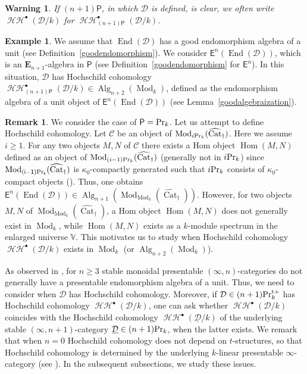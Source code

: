 \documentclass[leqno,12pt]{amsart}
\theoremstyle{plain}
\newtheorem{Warning}{Warning}[Theorem]
\theoremstyle{definition}
\newtheorem{Remark}[Theorem]{Remark}
\newtheorem{Example}[Theorem]{Example}
\newcommand{\HH}{\operatorname{\mathcal{HH}}}
\newcommand{\DDD}{\mathcal{D}}
\newcommand{\CCC}{\mathcal{C}}
\newcommand{\PR}{\textup{Pr}}
\newcommand{\PRTT}{\textup{Pr}^{\textup{t}+}}
\newcommand{\Hom}{\operatorname{Hom}}
\newcommand{\Mod}{\operatorname{Mod}}
\newcommand{\Alg}{\operatorname{Alg}}
\newcommand{\End}{\operatorname{End}}
\newcommand{\vCat}{\widehat{\operatorname{Cat}}_\dagger}
\begin{document}
\begin{Warning}
If $(n+1)\mathsf{P}$, in which $\DDD$ is defined, is clear, we often write $\HH^\bullet(\DDD/k)$ for $\HH^\bullet_{(n+1)\mathsf{P}}(\DDD/k)$.
\end{Warning}


\begin{Example}
We assume that $\End(\DDD)$ has a good endomorphism algebra of a unit (see Definition~\ref{goodendomorphism}).
We consider $\mathsf{E}^n(\End(\DDD))$, which is an $\mathbf{E}_{n+1}$-algebra in $\mathsf{P}$ (see Definition~\ref{goodendomorphism} for $\mathsf{E}^n$).
In this situation, $\DDD$ has
Hochschild cohomology $\HH^\bullet_{(n+1)\mathsf{P}}(\DDD/k)\in \Alg_{n+2}(\Mod_k)$, defined as the endomorphism algebra of a unit object of $\mathsf{E}^n(\End(\DDD))$
(see Lemma~\ref{goodalgebraization}).
\end{Example}

\begin{Remark}
\label{plaineasy}
We consider the case of $\mathsf{P}=\PR_k$.
Let us attempt to define Hochschild cohomology.
Let $\CCC$ be an object of $\Mod_{i\PR_k}(\vCat)$. Here we assume $i\ge1$.
For any two objects $M,N$ of $\CCC$
there exists a Hom object $\Hom(M,N)$ defined as an object of $\Mod_{(i-1)\PR_k}(\vCat)$
(generally not in $i\PR_k$)
since $\Mod_{\mathsf{(i-1)\PR_k}}(\vCat)$ is $\kappa_0$-compactly generated such that $i\PR_k$ consists of $\kappa_0$-compact objects (\cite[5.1.7]{Ste}). 
Thus, one obtains $\mathsf{E}^n(\End(\DDD))\in \Alg_{n+1}(\Mod_{\Mod_k}(\vCat))$.
However, for two objects $M,N$ of $\Mod_{\Mod_k}(\vCat)$,
a Hom object $\Hom(M,N)$ does not generally exist in $\Mod_k$, while
$\Hom(M,N)$ exists as a $k$-module spectrum in the enlarged universe $\mathbb{V}$.
This motivates us to study when Hochschild cohomology $\HH^\bullet(\DDD/k)$ exists in $\Mod_k$ (or $\Alg_{n+2}(\Mod_k)$).
\end{Remark}








As observed in \cite[Theorem C]{Ao}, for $n\ge3$ stable monoidal presentable $(\infty,n)$-categories do not generally have a presentable endomorphism algebra of a unit.
Thus, we need to consider when $\DDD$ has Hochschild cohomology.
Moreover, if $\DDD \in (n+1)\PRTT_k$ has Hochschild cohomology $\HH^\bullet(\DDD/k)$,
one can ask whether $\HH^\bullet(\DDD/k)$ coincides with the Hochschild cohomology $\HH^\bullet(\underline{\DDD}/k)$ of
the underlying stable $(\infty,n+1)$-category $\underline{\DDD}\in (n+1)\PR_k$, when the latter exists. We remark that when $n=0$
Hochschild cohomology does not depend on $t$-structures, so that Hochschild cohomology is determined by the underlying $k$-linear presentable $\infty$-category (see \cite{IH}).
In the subsequent subsections, we study these issues.
\end{document}
